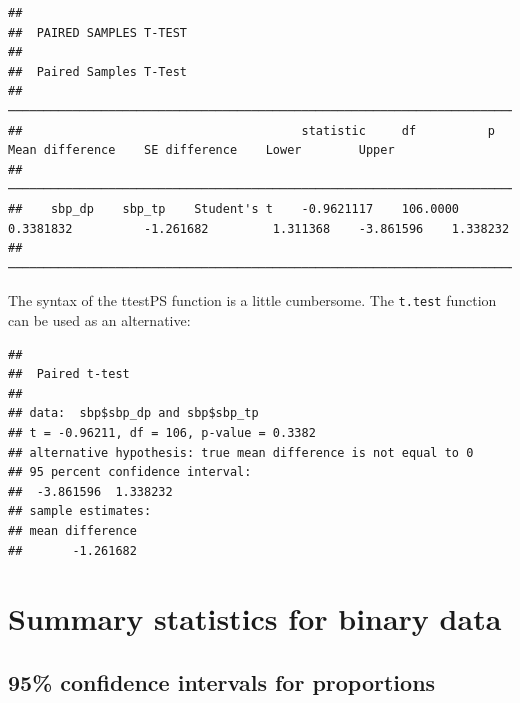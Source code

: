 \documentclass[
]{memoir}
\newenvironment{Shaded}{\begin{snugshade}}{\end{snugshade}}
\newcommand{\AttributeTok}[1]{\textcolor[rgb]{0.77,0.63,0.00}{#1}}
\newcommand{\ConstantTok}[1]{\textcolor[rgb]{0.00,0.00,0.00}{#1}}
\newcommand{\FunctionTok}[1]{\textcolor[rgb]{0.00,0.00,0.00}{#1}}
\newcommand{\NormalTok}[1]{#1}
\newcommand{\SpecialCharTok}[1]{\textcolor[rgb]{0.00,0.00,0.00}{#1}}
\begin{document}
\begin{verbatim}
## 
##  PAIRED SAMPLES T-TEST
## 
##  Paired Samples T-Test                                                                                                                   
##  ─────────────────────────────────────────────────────────────────────────────────────────────────────────────────────────────────────── 
##                                       statistic     df          p            Mean difference    SE difference    Lower        Upper      
##  ─────────────────────────────────────────────────────────────────────────────────────────────────────────────────────────────────────── 
##    sbp_dp    sbp_tp    Student's t    -0.9621117    106.0000    0.3381832          -1.261682         1.311368    -3.861596    1.338232   
##  ───────────────────────────────────────────────────────────────────────────────────────────────────────────────────────────────────────
\end{verbatim}

The syntax of the ttestPS function is a little cumbersome. The \texttt{t.test} function can be used as an alternative:

\begin{Shaded}
\end{Shaded}

\begin{verbatim}
## 
##  Paired t-test
## 
## data:  sbp$sbp_dp and sbp$sbp_tp
## t = -0.96211, df = 106, p-value = 0.3382
## alternative hypothesis: true mean difference is not equal to 0
## 95 percent confidence interval:
##  -3.861596  1.338232
## sample estimates:
## mean difference 
##       -1.261682
\end{verbatim}

\hypertarget{summary-statistics-for-binary-data}{%
\chapter{Summary statistics for binary data}\label{summary-statistics-for-binary-data}}

\hypertarget{confidence-intervals-for-proportions}{%
\section{95\% confidence intervals for proportions}\label{confidence-intervals-for-proportions}}
\end{document}
